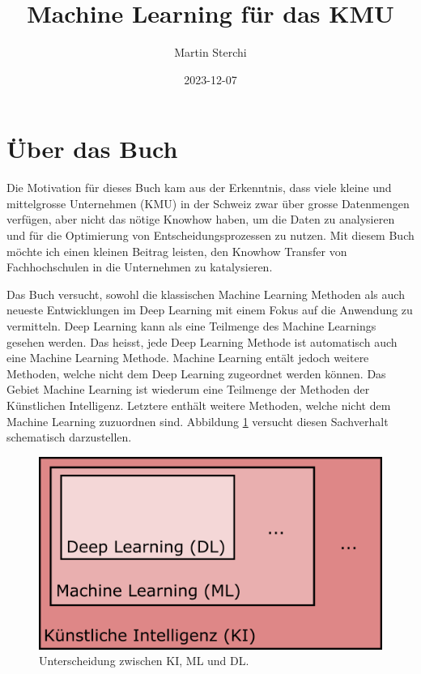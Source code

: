 \documentclass[
]{book}
\title{Machine Learning für das KMU}
\author{Martin Sterchi}
\date{2023-12-07}
\begin{document}
\maketitle

{
\setcounter{tocdepth}{1}
\tableofcontents
}
\hypertarget{uxfcber-das-buch}{%
\chapter*{Über das Buch}\label{uxfcber-das-buch}}

Die Motivation für dieses Buch kam aus der Erkenntnis, dass viele kleine und mittelgrosse Unternehmen (KMU) in der Schweiz zwar über grosse Datenmengen verfügen, aber nicht das nötige Knowhow haben, um die Daten zu analysieren und für die Optimierung von Entscheidungsprozessen zu nutzen. Mit diesem Buch möchte ich einen kleinen Beitrag leisten, den Knowhow Transfer von Fachhochschulen in die Unternehmen zu katalysieren.

Das Buch versucht, sowohl die klassischen Machine Learning Methoden als auch neueste Entwicklungen im Deep Learning mit einem Fokus auf die Anwendung zu vermitteln. Deep Learning kann als eine Teilmenge des Machine Learnings gesehen werden. Das heisst, jede Deep Learning Methode ist automatisch auch eine Machine Learning Methode. Machine Learning entält jedoch weitere Methoden, welche nicht dem Deep Learning zugeordnet werden können. Das Gebiet Machine Learning ist wiederum eine Teilmenge der Methoden der Künstlichen Intelligenz. Letztere enthält weitere Methoden, welche nicht dem Machine Learning zuzuordnen sind. Abbildung \ref{fig:kimldl} versucht diesen Sachverhalt schematisch darzustellen.

\begin{figure}

{\centering \includegraphics[width=0.6\linewidth]{images/KI_ML_DL} 

}

\caption{Unterscheidung zwischen KI, ML und DL. }\label{fig:kimldl}
\end{figure}
\end{document}
